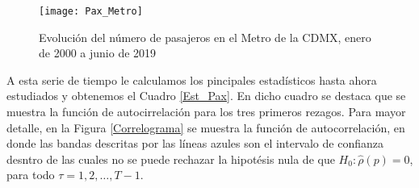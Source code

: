 \documentclass[
  a4paper,
]{article}
\begin{document}
\begin{figure}
  \centering
  \texttt{[image: Pax\_Metro]}
  \caption{Evolución del número de pasajeros en el Metro de la CDMX, enero de 2000 a junio de 2019}
  \label{Pax_Metro}
\end{figure}

A esta serie de tiempo le calculamos los pincipales estadísticos hasta
ahora estudiados y obtenemos el Cuadro \ref{Est_Pax}. En dicho cuadro se
destaca que se muestra la función de autocirrelación para los tres
primeros rezagos. Para mayor detalle, en la Figura \ref{Correlograma} se
muestra la función de autocorrelación, en donde las bandas descritas por
las líneas azules son el intervalo de confianza desntro de las cuales no
se puede rechazar la hipotésis nula de que \(H_0: \hat{\rho}(p) = 0\),
para todo \(\tau = 1, 2, \ldots, T-1\).
\end{document}
